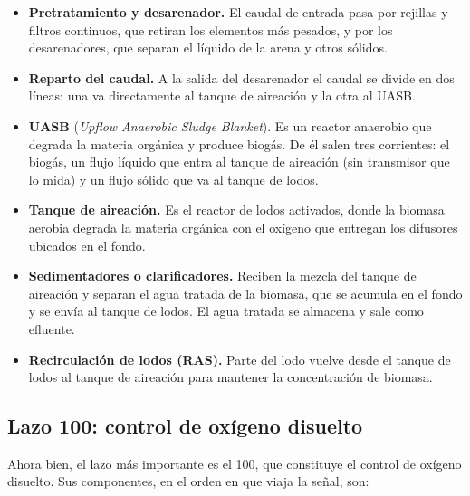 \begin{itemize}
  \item \textbf{Pretratamiento y desarenador.} El caudal de entrada pasa por
  rejillas y filtros continuos, que retiran los elementos más pesados, y por
  los desarenadores, que separan el líquido de la arena y otros sólidos.

  \item \textbf{Reparto del caudal.} A la salida del desarenador el caudal se
  divide en dos líneas: una va directamente al tanque de aireación y la
  otra al UASB.

  \item \textbf{UASB} (\emph{Upflow Anaerobic Sludge Blanket}). Es un reactor
  anaerobio que degrada la materia orgánica y produce biogás. De él salen tres
  corrientes: el biogás, un flujo líquido que entra al tanque de aireación (sin
  transmisor que lo mida) y un flujo sólido que va al tanque de lodos.

  \item \textbf{Tanque de aireación.} Es el reactor de lodos activados,
  donde la biomasa aerobia degrada la materia orgánica con el oxígeno que
  entregan los difusores ubicados en el fondo.

  \item \textbf{Sedimentadores o clarificadores.} Reciben la mezcla del
  tanque de aireación y separan el agua tratada de la biomasa, que se acumula
  en el fondo y se envía al tanque de lodos. El agua tratada se almacena y sale
  como efluente.


  \item \textbf{Recirculación de lodos (RAS).} Parte del lodo vuelve desde el
  tanque de lodos al tanque de aireación para mantener la concentración de
  biomasa.
\end{itemize}

\subsection*{Lazo 100: control de oxígeno disuelto}

Ahora bien, el lazo más importante es el 100, que constituye el control de
oxígeno disuelto. Sus componentes, en el orden en que viaja la señal, son:

